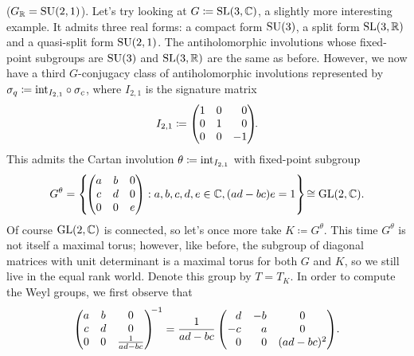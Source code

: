 \noindent\begin{example}\textup{($G_\mathbb{R} = \textup{SU}(2,1)$).} Let's try looking at $G \coloneqq \textup{SL}(3, \mathbb{C})$, a slightly more interesting example. It admits three real forms: a compact form $\textup{SU}(3)$, a split form $\textup{SL}(3, \mathbb{R})$ and a quasi-split form $\textup{SU}(2, 1)$. The antiholomorphic involutions whose fixed-point subgroups are $\textup{SU}(3)$ and $\textup{SL}(3, \mathbb{R})$ are the same as before. However, we now have a third $G$-conjugacy class of antiholomorphic involutions represented by $\sigma_q \coloneqq \textup{int}_{I_{2,1}} \circ \sigma_c$, where $I_{2,1}$ is the signature matrix
\begin{align*}
\begin{split}
I_{2,1} \coloneqq \begin{pmatrix}1&0&\hphantom{-}0\\0&1&\hphantom{-}0\\0&0&-1\end{pmatrix}\!\!.
\end{split}
\end{align*}
\noindent This admits the Cartan involution $\theta \coloneqq \textup{int}_{I_{2,1}}$ with fixed-point subgroup
\begin{align*}
\begin{split}
G^\theta = \left\{\!\begin{pmatrix}a&b&0\\c&d&0\\0&0&e\end{pmatrix} : a, b, c, d, e \in \mathbb{C}, (ad - bc)e = 1\right\}\! \cong \textup{GL}(2, \mathbb{C}).
\end{split}
\end{align*}
\noindent Of course $\textup{GL}(2, \mathbb{C})$ is connected, so let's once more take $K \coloneqq G^\theta$. This time $G^\theta$ is not itself a maximal torus; however, like before, the subgroup of diagonal matrices with unit determinant is a maximal torus for both $G$ and $K$, so we still live in the equal rank world. Denote this group by $T = T_K$. In order to compute the Weyl groups, we first observe that\newpage
\begin{align*}
\begin{split}
\begin{pmatrix}a&b&0\\c&d&0\\0&0&\frac{1}{ad-bc}\end{pmatrix}^{\!\!-1} = \frac{1}{ad-bc}\begin{pmatrix}\hphantom{-}d&-b&0\\-c&\hphantom{-}a&0\\\hphantom{-}0&\hphantom{-}0&(ad-bc)^2\end{pmatrix}\!.

\end{split}
\end{align*}
\end{example}
